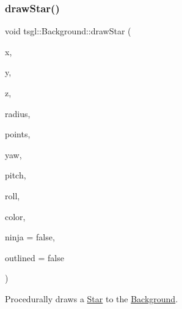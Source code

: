 \subsubsection{\texorpdfstring{draw\+Star()}{drawStar()}\hspace{0.1cm}{\footnotesize\ttfamily [1/2]}}
{\footnotesize\ttfamily void tsgl\+::\+Background\+::draw\+Star (\begin{DoxyParamCaption}\item[{float}]{x,  }\item[{float}]{y,  }\item[{float}]{z,  }\item[{float}]{radius,  }\item[{int}]{points,  }\item[{float}]{yaw,  }\item[{float}]{pitch,  }\item[{float}]{roll,  }\item[{\hyperlink{structtsgl_1_1_color_float}{Color\+Float}}]{color,  }\item[{bool}]{ninja = {\ttfamily false},  }\item[{bool}]{outlined = {\ttfamily false} }\end{DoxyParamCaption})\hspace{0.3cm}{\ttfamily [virtual]}}



Procedurally draws a \hyperlink{classtsgl_1_1_star}{Star} to the \hyperlink{classtsgl_1_1_background}{Background}. 

